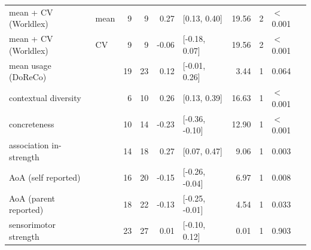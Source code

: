\begin{table}[ht]
\begin{tabular}{llrrrlrrl}
  mean + CV (Worldlex) & mean & 9 & 9 & 0.27 & [0.13, 0.40] & 19.56 & 2 & $<$ 0.001 \\ 
  mean + CV (Worldlex) & CV & 9 & 9 & -0.06 & [-0.18, 0.07] & 19.56 & 2 & $<$ 0.001 \\ 
  mean usage (DoReCo) &  & 19 & 23 & 0.12 & [-0.01, 0.26] & 3.44 & 1 & 0.064 \\ 
  contextual diversity &  & 6 & 10 & 0.26 & [0.13, 0.39] & 16.63 & 1 & $<$ 0.001 \\ 
  concreteness &  & 10 & 14 & -0.23 & [-0.36, -0.10] & 12.90 & 1 & $<$ 0.001 \\ 
  association in-strength &  & 14 & 18 & 0.27 & [0.07, 0.47] & 9.06 & 1 & 0.003 \\ 
  AoA (self reported) &  & 16 & 20 & -0.15 & [-0.26, -0.04] & 6.97 & 1 & 0.008 \\ 
  AoA (parent reported) &  & 18 & 22 & -0.13 & [-0.25, -0.01] & 4.54 & 1 & 0.033 \\ 
  sensorimotor strength &  & 23 & 27 & 0.01 & [-0.10, 0.12] & 0.01 & 1 & 0.903 \\ 
   \hline
\end{tabular}
\end{table}
